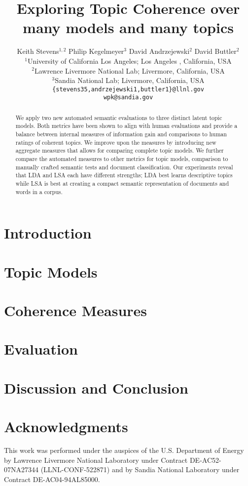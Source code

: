 \documentclass[11pt]{article}
\title{Exploring Topic Coherence over many models and many topics}
\author{Keith Stevens$^{1,2}$ 
        Philip Kegelmeyer$^{3}$
        David Andrzejewski$^{2}$
        David Buttler$^{2}$ \\
  $^{1}$University of California Los Angeles; Los Angeles , California, USA \\
  $^{2}$Lawrence Livermore National Lab; Livermore, California, USA \\
  $^{3}$Sandia National Lab; Livermore, California, USA \\
  {\tt \{stevens35,andrzejewski1,buttler1\}@llnl.gov} \\
  {\tt wpk@sandia.gov}
}
\date{}
\begin{document}
\maketitle
\begin{abstract}
We apply two new automated semantic evaluations to three distinct latent topic
models.  Both metrics have been shown to align with human evaluations and
provide a balance between internal measures of information gain and comparisons
to human ratings of coherent topics.  We improve upon the measures by
introducing new aggregate measures that allows for comparing complete topic
models.  We further compare the automated measures to other metrics for topic
models, comparison to manually crafted semantic tests and document
classification.  Our experiments reveal that LDA and LSA each have different
strengths; LDA best learns descriptive topics while LSA is best at creating a
compact semantic representation of documents and words in a corpus. 
\end{abstract}

\section{Introduction}



\section{Topic Models}


\section{Coherence Measures}


\section{Evaluation}


\section{Discussion and Conclusion}


\section{Acknowledgments}

This work was performed under the auspices of the U.S. Department of Energy by
Lawrence Livermore National Laboratory under Contract DE-AC52-07NA27344
(LLNL-CONF-522871) and by Sandia National Laboratory under Contract
DE-AC04-94AL85000.



\end{document}

